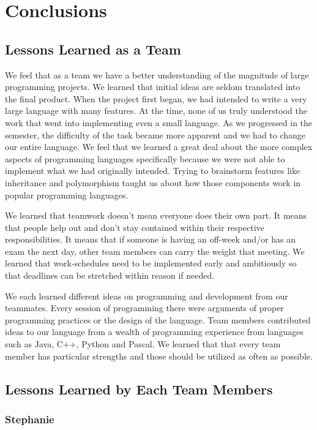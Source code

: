 \documentclass[12pt]{report}
\begin{document}
\chapter{Conclusions}

\section{Lessons Learned as a Team}

We feel that as a team we have a better understanding of the magnitude of large programming projects. We learned that initial ideas are seldom translated into the final product. When the project first began, we had intended to write a very large language with many features. At the time, none of us truly understood the work that went into implementing even a small language. As we progressed in the semester, the difficulty of the task became more apparent and we had to change our entire language. We feel that we learned a great deal about the more complex aspects of programming languages specifically because we were not able to implement what we had originally intended. Trying to brainstorm features like inheritance and polymorphism taught us about how those components work in popular programming languages. 

We learned that teamwork doesn’t mean everyone does their own part. It means that people help out and don’t stay contained within their respective responsibilities. It means that if someone is having an off-week and/or has an exam the next day, other team members can carry the weight that meeting. We learned that work-schedules need to be implemented early and ambitiously so that deadlines can be stretched within reason if needed.

We each learned different ideas on programming and development from our teammates. Every session of programming there were arguments of proper programming practices or the design of the language. Team members contributed ideas to our language from a wealth of programming experience from languages such as Java, C++, Python and Pascal. We learned that that every team member has particular strengths and those should be utilized as often as possible.

\section{Lessons Learned by Each Team Members}

\subsection{Stephanie}
\end{document}
